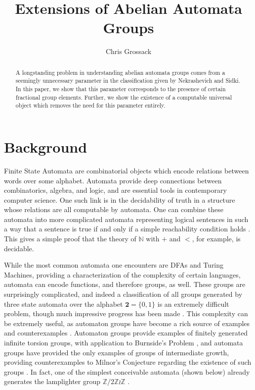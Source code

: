 \documentclass[runningheads]{llncs}
\title{Extensions of Abelian Automata Groups}
\author{Chris Grossack\orcidID{0000-0001-7520-9747}}
\institute%
{%
  Carnegie Mellon University, Pittsburgh, USA\\
  \email{cgrossac@andrew.cmu.edu}
}
\newcommand{\Z}{\mathbb{Z}}
\newcommand{\2}{\textbf{2}}
\begin{document}
\maketitle

\begin{abstract}
  A longstanding problem in understanding abelian automata groups
  comes from a seemingly unnecessary parameter in the classification
  given by Nekrashevich and Sidki. In this paper, we show that
  this parameter corresponds to the presence of certain fractional group
  elements. Further, we show the existence of a computable universal object 
  which removes the need for this parameter entirely.

\end{abstract}


\section{Background}
Finite State Automata are combinatorial objects which encode relations 
between words over some alphabet. Automata provide deep connections between
combinatorics, algebra, and logic, and are essential tools in contemporary 
computer science. One such link is in the decidability of truth in a structure
whose relations are all computable by automata. One can combine these automata 
into more complicated automata representing logical sentences in such a way 
that a sentence is true if and only if a simple reachability condition holds
\cite{Brny07:automatic_structures}. This gives a simple proof that the theory 
of $\mathbb{N}$ with $+$ and $<$, for example, is decidable.

While the most common automata one encounters are DFAs
and Turing Machines, providing a characterization of the complexity of 
certain languages, automata can encode functions, and therefore groups,
as well. These groups are surprisingly complicated, and indeed a 
classification of all groups generated by three state automata over the 
alphabet $\2 = \{0,1\}$ is an extremely difficult problem, though much
impressive progress has been made \cite{Bondarenko09:three_state}. This
complexity can be extremely useful, as automaton groups have become a rich
source of examples and counterexamples
\cite{Nekrashevych05:self_similar_groups%
     ,Sidki00:one_rooted_trees%
     ,GrigorchukNS00:automata_groups%
     }. 
Automaton groups provide examples of
finitely generated infinite torsion groups, with application to 
Burnside's Problem \cite{Gupta83:burnside}, and automata groups have
provided the only examples of groups of intermediate growth, providing 
counterexamples to Milnor's Conjecture regarding the existence of such groups
\cite{Grigorchuk11:Milnor}. In fact, one of the simplest conceivable automata 
(shown below) already generates the lamplighter group $\Z/2\Z \wr \Z$
\cite{GrigorchukZuk01:lamplighter}.
\end{document}
